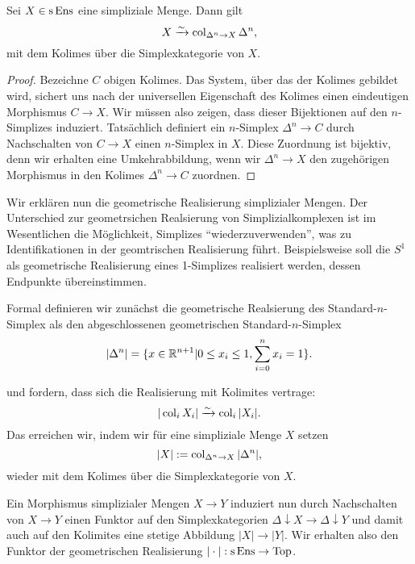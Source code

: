 \begin{lemma}
  Sei $X \in \operatorname{s}\operatorname{Ens}$ eine simpliziale Menge. Dann gilt
  \[ X \xrightarrow{\sim} \operatorname{col}_{\Delta^n \to X} \Delta^n, \]
  mit dem Kolimes über die Simplexkategorie von $X$.
\end{lemma}
\begin{proof}
  Bezeichne $C$ obigen Kolimes. Das System, über das der Kolimes
  gebildet wird, sichert uns nach der universellen Eigenschaft des
  Kolimes einen eindeutigen Morphismus $C \to X$. Wir müssen also
  zeigen, dass dieser Bijektionen auf den $n$-Simplizes
  induziert. Tatsächlich definiert ein $n$-Simplex $\Delta^n \to C$
  durch Nachschalten von $C \to X$ einen $n$-Simplex in $X$. Diese
  Zuordnung ist bijektiv, denn wir erhalten eine Umkehrabbildung, wenn
  wir $\Delta^n \to X$ den zugehörigen Morphismus in den Kolimes
  $\Delta^n \to C$ zuordnen.
\end{proof}

Wir erklären nun die geometrische Realisierung simplizialer
Mengen. Der Unterschied zur geometrsichen Realsierung von
Simplizialkomplexen ist im Wesentlichen die Möglichkeit, Simplizes
``wiederzuverwenden'', was zu Identifikationen in der geomtrischen
Realisierung führt. Beispielsweise soll die $S^1$ als geometrische
Realisierung eines 1-Simplizes realisiert werden, dessen Endpunkte
übereinstimmen.

Formal definieren wir zunächst die geometrische Realsierung des
Standard-$n$-Simplex als den abgeschlossenen geometrischen
Standard-$n$-Simplex
\[ |\Delta^n| = \{ x \in \mathbb{R}^{n+1} | 0 \leq x_i \leq 1, \sum_{i=0}^n x_i = 1 \}. \]


und fordern, dass sich die Realisierung mit Kolimites vertrage:
\[ |\operatorname{col}_i X_i| \xrightarrow{\sim} \operatorname{col}_i |X_i|. \]
Das erreichen wir, indem wir für eine simpliziale Menge $X$ setzen
\[ |X| := \operatorname{col}_{\Delta^n \to X} |\Delta^n|, \]
wieder mit dem Kolimes über die Simplexkategorie von $X$.

Ein Morphismus simplizialer Mengen $X \to Y$ induziert nun durch
Nachschalten von $X \to Y$ einen Funktor auf den Simplexkategorien
$\Delta \downarrow X \to \Delta \downarrow Y$ und damit auch auf den
Kolimites eine stetige Abbildung $|X| \to |Y|$. Wir erhalten also den
Funktor der geometrischen Realisierung $| \cdot |: \operatorname{s} \operatorname{Ens} \to \operatorname{Top}$.


